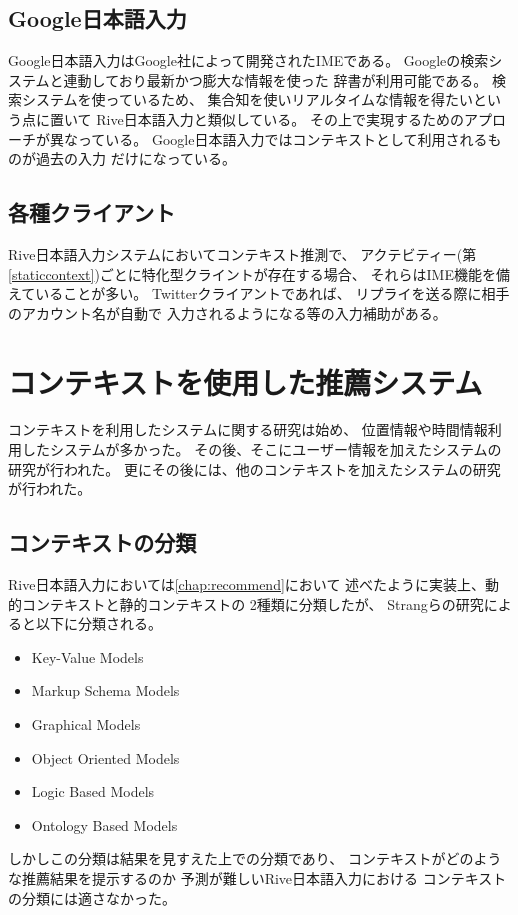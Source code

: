 \subsection{Google日本語入力}
Google日本語入力はGoogle社によって開発されたIMEである。
Googleの検索システムと連動しており最新かつ膨大な情報を使った
辞書が利用可能である。
検索システムを使っているため、
集合知を使いリアルタイムな情報を得たいという点に置いて
Rive日本語入力と類似している。
その上で実現するためのアプローチが異なっている。
Google日本語入力ではコンテキストとして利用されるものが過去の入力
だけになっている。

\subsection{各種クライアント}
Rive日本語入力システムにおいてコンテキスト推測で、
アクテビティー(第\ref{staticcontext})ごとに特化型クライントが存在する場合、
それらはIME機能を備えていることが多い。
Twitterクライアントであれば、
リプライを送る際に相手のアカウント名が自動で
入力されるようになる等の入力補助がある。

\section{コンテキストを使用した推薦システム}
コンテキストを利用したシステムに関する研究は始め、
位置情報や時間情報利用したシステムが多かった。
その後、そこにユーザー情報を加えたシステムの研究が行われた。
更にその後には、他のコンテキストを加えたシステムの研究が行われた。
\cite{okukenta}

\subsection{コンテキストの分類}
Rive日本語入力においては\ref{chap:recommend}において
述べたように実装上、動的コンテキストと静的コンテキストの
2種類に分類したが、
Strangらの研究\cite{contextsurvey}によると以下に分類される。
\begin{itemize}
  \item Key-Value Models
  \item Markup Schema Models
  \item Graphical Models
  \item Object Oriented Models
  \item Logic Based Models
  \item Ontology Based Models
\end{itemize}
しかしこの分類は結果を見すえた上での分類であり、
コンテキストがどのような推薦結果を提示するのか
予測が難しいRive日本語入力における
コンテキストの分類には適さなかった。

\subsection{}
